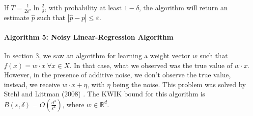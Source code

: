 If $T = \frac{1}{2\varepsilon^2}\ln \frac{2}{\delta}$, with probability at least
$1 - \delta$, the algorithm will return an estimate $\hat{p}$ such that
$|\hat{p} - p| \leq \varepsilon$.

\paragraph{Algorithm 5: Noisy Linear-Regression Algorithm}
In section 3, we saw an algorithm for learning a weight vector $w$ such that
$f(x) = w \cdot x \ \forall x \in X$. In that case, what we observed was the
true value of $w \cdot x$. However, in the presence of additive noise, we don't
observe the true value, instead, we receive $w \cdot x + \eta$, with $\eta$
being the noise. This problem was solved by Stehl and Littman (2008)
\cite{Strehl}. The KWIK bound for this algorithm is $B(\varepsilon, \delta) =
O\left( \frac{d^3}{\varepsilon^4} \right)$, where $w \in \mathbb{R}^d$.
